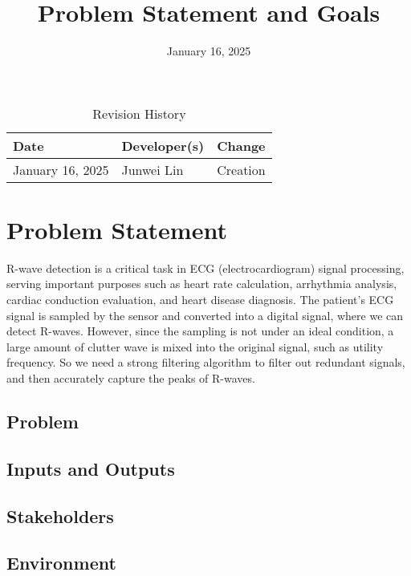 \documentclass{article}
\title{Problem Statement and Goals\\\progname}
\author{\authname}
\date{January 16, 2025}
\begin{document}
\maketitle

\begin{table}[hp]
\caption{Revision History} \label{TblRevisionHistory}
\begin{tabularx}{\textwidth}{llX}
\toprule
\textbf{Date} & \textbf{Developer(s)} & \textbf{Change}\\
\midrule
January 16, 2025 & Junwei Lin & Creation\\
\bottomrule
\end{tabularx}
\end{table}

\section{Problem Statement}

R-wave detection is a critical task in ECG (electrocardiogram) signal processing, serving important purposes such as heart rate calculation, arrhythmia analysis, cardiac conduction evaluation, and heart disease diagnosis. The patient's ECG signal is sampled by the sensor and converted into a digital signal, where we can detect R-waves. However, since the sampling is not under an ideal condition, a large amount of clutter wave is mixed into the original signal, such as utility frequency. So we need a strong filtering algorithm to filter out redundant signals, and then accurately capture the peaks of R-waves.

\subsection{Problem}

\subsection{Inputs and Outputs}


\subsection{Stakeholders}

\subsection{Environment}
\end{document}
